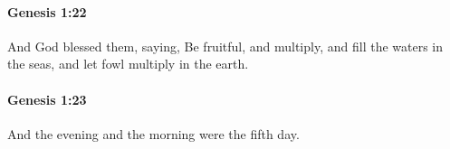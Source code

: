 		\paragraph{Genesis 1:22} %
			\label{GENESIS-1-22}

			And God blessed them, saying, Be fruitful, and multiply, and fill the waters in the seas, and let fowl multiply in the earth.


		\paragraph{Genesis 1:23} %
			\label{GENESIS-1-23}

			And the evening and the morning were the fifth day.


